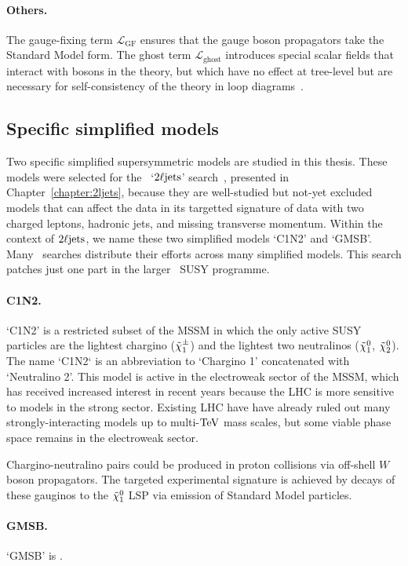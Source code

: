 \paragraph{Others.}
The gauge-fixing term $\mathcal{L}_\mathrm{GF}$ ensures that the gauge boson
propagators take the Standard Model form.
The ghost term $\mathcal{L}_\mathrm{ghost}$ introduces special scalar fields
that interact with bosons in the theory, but which have no effect at tree-level
but are necessary for self-consistency of the theory in loop
diagrams~\cite{martin2016primer, kuroda1999complete}.


\subsection{Specific simplified models}
Two specific simplified supersymmetric models are studied in this thesis.
These models were selected for the \atlas\ `$\twoljets$'
search~\cite{atlas2022searches},
presented in Chapter~\ref{chapter:2ljets},
because they are well-studied but not-yet excluded models that can affect the
data in its targetted signature of data with two charged leptons,
hadronic jets, and missing transverse momentum.
Within the context of $\twoljets$, we name these two simplified models
`C1N2' and `GMSB'.
Many \atlas\ searches distribute their efforts across many simplified models.
This search patches just one part in the larger \atlas\ SUSY programme.

\paragraph{C1N2.}
`C1N2' is a restricted subset of the MSSM in which the only active SUSY
particles
are the lightest chargino ($\chargino_1$)
and the lightest two neutralinos ($\neutralino_1$, $\neutralino_2$).
The name `C1N2` is an abbreviation to
`Chargino 1' concatenated with `Neutralino 2'.
This model is active in the electroweak sector of the MSSM, which has received
increased interest in recent years because the LHC is more sensitive to models
in the strong sector.
Existing LHC have have already ruled out many strongly-interacting models
up to multi-$\eV[T]$ mass scales, but some viable phase space remains in the
electroweak sector.

Chargino-neutralino pairs could be produced in proton collisions via off-shell
$W$ boson propagators.
The targeted experimental signature is achieved by decays of these gauginos
to the $\neutralino_1$ LSP via emission of Standard Model particles.


\paragraph{GMSB.}
`GMSB' is \TODO{}.



